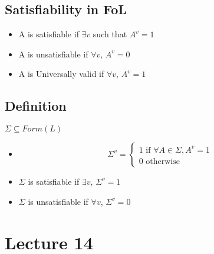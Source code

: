 \documentclass[11pt]{article}
\begin{document}
\subsection{Satisfiability in FoL}
\begin{itemize}
    \item A is satisfiable if $\exists v$ such that $A^v = 1$
    \item A is unsatisfiable if $\forall v$, $A^v = 0$
    \item A is Universally valid if $\forall v$, $A^v = 1$
\end{itemize}
\subsection{Definition}
$\Sigma\subseteq Form(L)$
\begin{itemize}
    \item 
    \begin{equation*}
        \Sigma^v = 
        \begin{cases}
            1 \text{ if } \forall A\in \Sigma, A^v = 1\\
            0\text{ otherwise }
        \end{cases}
    \end{equation*}
    \item $\Sigma$ is satisfiable if $\exists v$, $\Sigma^v = 1$
    \item $\Sigma$ is unsatisfiable if $\forall v$, $\Sigma^v =0$
\end{itemize}

\section{Lecture 14}
\end{document}
